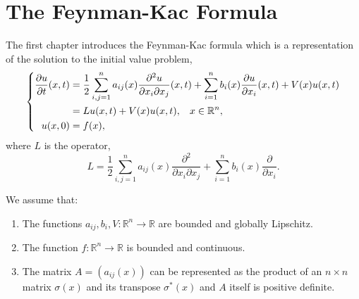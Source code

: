\documentclass[a4paper,12pt,draft]{report}
\begin{document}
\chapter{The Feynman-Kac Formula}

The first chapter introduces the Feynman-Kac formula which is a representation of the solution to the initial value problem,
\begin{equation}
\left\{
\begin{aligned}
\frac{\partial u}{\partial t}(x, t) & = \frac{1}{2}\sum_{i, j = 1}^n a_{ij}(x)\frac{\partial^2 u}{\partial x_i \partial x_j}(x, t) + \sum_{i = 1}^n b_i(x)\frac{\partial u}{\partial x_i}(x, t) + V(x)u(x, t)\\
& = Lu(x, t) + V(x)u(x, t), \hspace{0.3cm} x \in \mathbb{R}^n,\\ \label{CP}
u(x, 0) & = f(x),
\end{aligned}
\right.
\end{equation}
where $L$ is the operator,
$$
L = \frac{1}{2}\sum_{i, j = 1}^n a_{ij}(x)\frac{\partial^2}{\partial x_i \partial x_j} + \sum_{i = 1}^n b_i(x)\frac{\partial}{\partial x_i}.
$$
\assumption
{
We assume that:
\begin{enumerate}
\item The functions $a_{ij}, b_i, V : \mathbb{R}^n \to \mathbb{R}$ are bounded and globally Lipschitz.
\item The function $f : \mathbb{R}^n \to \mathbb{R}$ is bounded and continuous.
\item The matrix $A = (a_{ij}(x))$ can be represented as the product of an $n \times n$ matrix $\sigma(x)$ and its transpose $\sigma^*(x)$ and $A$ itself is positive definite.
\end{enumerate}
}
\end{document}
